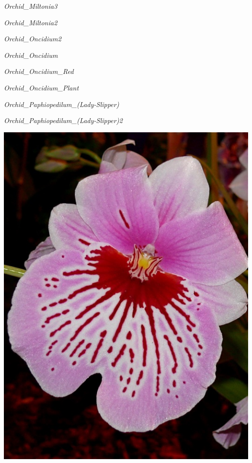 \documentclass{article}
\begin{document}
\noindent
\vfill
\centerline{{\Large\emph{Orchid_Miltonia3}}}
\vfill
\newpage

\noindent
\vfill
\centerline{{\Large\emph{Orchid_Miltonia2}}}
\vfill
\newpage

\noindent
\vfill
\centerline{{\Large\emph{Orchid_Oncidium2}}}
\vfill
\newpage

\noindent
\vfill
\centerline{{\Large\emph{Orchid_Oncidium}}}
\vfill
\newpage

\noindent
\vfill
\centerline{{\Large\emph{Orchid_Oncidium_Red}}}
\vfill
\newpage

\noindent
\vfill
\centerline{{\Large\emph{Orchid_Oncidium_Plant}}}
\vfill
\newpage

\noindent
\vfill
\centerline{{\Large\emph{Orchid_Paphiopedilum_(Lady-Slipper)}}}
\vfill
\newpage

\noindent
\vfill
\centerline{{\Large\emph{Orchid_Paphiopedilum_(Lady-Slipper)2}}}
\vfill
\newpage

\begin{center}
\includegraphics[height=0.9\textheight, angle=90]{../Orchid_Miltonia2.jpg}
\end{center}
\newpage
\end{document}
